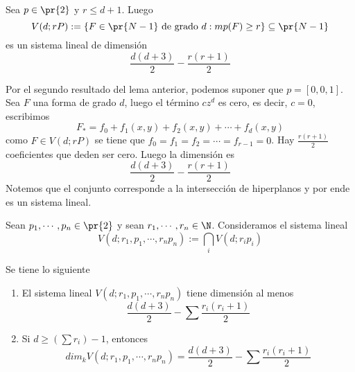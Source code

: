\documentclass{article}
\begin{document}
\begin{prop}
    Sea $p\in\pr{2}$ y $r\leq d+1$. Luego
    \begin{equation*}
        V(d;rP):=\{F\in\pr{N-1}\text{ de grado }d:mp(F)\geq r\}\subseteq\pr{N-1}
    \end{equation*}
    es un sistema lineal de dimensión
    \begin{equation*}
        \frac{d(d+3)}{2}-\frac{r(r+1)}{2}
    \end{equation*}
\end{prop}
\begin{dem}
    Por el segundo resultado del lema anterior, podemos suponer que $p=[0,0,1]$. Sea $F$ una forma
    de grado $d$, luego el término $cz^{d}$ es cero, es decir, $c=0$, escribimos
    \begin{equation*}
        F_{*}=f_{0}+f_{1}(x,y)+f_{2}(x,y)+\cdots+f_{d}(x,y)
    \end{equation*}
    como $F\in V(d;rP)$ se tiene que $f_{0}=f_{1}=f_{2}=\cdots=f_{r-1}=0$. Hay $\frac{r(r+1)}{2}$
    coeficientes que deden ser cero. Luego la dimensión es
    \begin{equation*}
        \frac{d(d+3)}{2}-\frac{r(r+1)}{2}
    \end{equation*}
    Notemos que el conjunto corresponde a la intersección de hiperplanos y por ende es un sistema 
    lineal. 
\end{dem}
\noindent Sean $p_{1},\cdots,p_{n}\in\pr{2}$ y sean $r_{1},\cdots,r_{n}\in\N$. Consideramos el
sistema lineal
\begin{equation*}
    V(d;r_{1},p_{1},\cdots,r_{n}p_{n}):=\bigcap_{i}V(d;r_{i}p_{i})
\end{equation*}
\begin{teo}
    Se tiene lo siguiente
    \begin{enumerate}
        \item El sistema lineal $V(d;r_{1},p_{1},\cdots,r_{n}p_{n})$ tiene dimensión al menos
        \begin{equation*}
            \frac{d(d+3)}{2}-\sum\frac{r_{i}(r_{i}+1)}{2}
        \end{equation*}

        \item Si $d\geq(\sum r_{i})-1$, entonces
        \begin{equation*}
            dim_{k}V(d;r_{1},p_{1},\cdots,r_{n}p_{n})=\frac{d(d+3)}{2}-\sum\frac{r_{i}(r_{i}+1)}{2}
        \end{equation*}
    \end{enumerate}
\end{teo}

\end{document}
